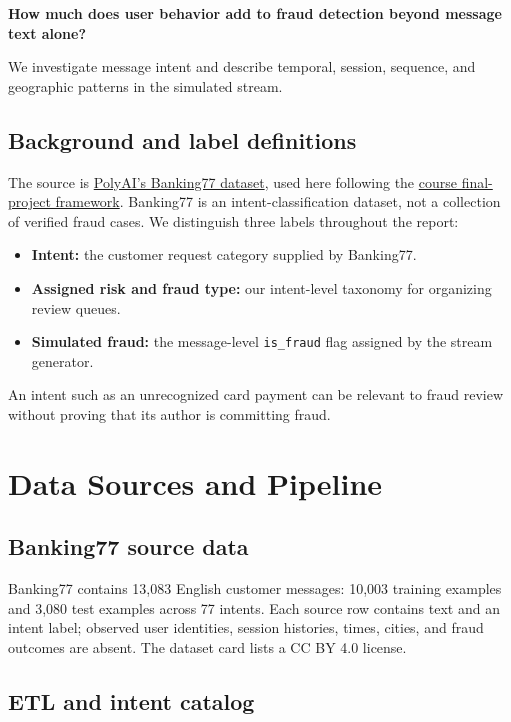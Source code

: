 \documentclass[
  english,
  11pt,
  letterpaper,
]{article}
\providecommand{\tightlist}{%
  \setlength{\itemsep}{0pt}\setlength{\parskip}{0pt}}
\begin{document}
\textbf{How much does user behavior add to fraud detection beyond
message text alone?}

We investigate message intent and describe temporal, session, sequence,
and geographic patterns in the simulated stream.

\subsection{Background and label
definitions}\label{background-and-label-definitions}

The source is
\href{https://huggingface.co/datasets/PolyAI/banking77}{PolyAI's
Banking77 dataset}, used here following the
\href{https://jjacobs.me/dsan6000/final-project/}{course final-project
framework}. Banking77 is an intent-classification dataset, not a
collection of verified fraud cases. We distinguish three labels
throughout the report:

\begin{itemize}
\tightlist
\item
  \textbf{Intent:} the customer request category supplied by Banking77.
\item
  \textbf{Assigned risk and fraud type:} our intent-level taxonomy for
  organizing review queues.
\item
  \textbf{Simulated fraud:} the message-level \texttt{is\_fraud} flag
  assigned by the stream generator.
\end{itemize}

An intent such as an unrecognized card payment can be relevant to fraud
review without proving that its author is committing fraud.

\section{Data Sources and Pipeline}\label{sec-data}

\subsection{Banking77 source data}\label{banking77-source-data}

Banking77 contains 13,083 English customer messages: 10,003 training
examples and 3,080 test examples across 77 intents. Each source row
contains text and an intent label; observed user identities, session
histories, times, cities, and fraud outcomes are absent. The dataset
card lists a CC BY 4.0 license.

\subsection{ETL and intent catalog}\label{etl-and-intent-catalog}
\end{document}
